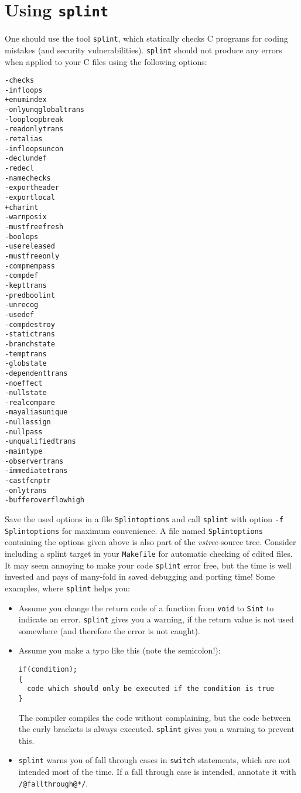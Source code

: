 \documentclass[12pt]{article}
\begin{document}
\section{Using \texttt{splint}}
One should use the tool \texttt{splint}, which  statically checks C programs 
for coding mistakes (and security vulnerabilities).
\texttt{splint} should not produce any errors when applied to your C files using the following options:
\begin{footnotesize}
\begin{verbatim}
-checks
-infloops
+enumindex
-onlyunqglobaltrans
-looploopbreak
-readonlytrans
-retalias
-infloopsuncon
-declundef
-redecl
-namechecks
-exportheader
-exportlocal
+charint
-warnposix
-mustfreefresh
-boolops
-usereleased
-mustfreeonly
-compmempass
-compdef
-kepttrans
-predboolint
-unrecog
-usedef
-compdestroy
-statictrans
-branchstate
-temptrans
-globstate
-dependenttrans
-noeffect
-nullstate
-realcompare
-mayaliasunique
-nullassign
-nullpass
-unqualifiedtrans
-maintype
-observertrans
-immediatetrans
-castfcnptr
-onlytrans
-bufferoverflowhigh
\end{verbatim}
\end{footnotesize}
Save the used options in a file \texttt{Splintoptions} and call \texttt{splint} with option \texttt{-f Splintoptions} for maximum convenience. 
A file named \texttt{Splintoptions} containing the options given above is also
part of the \emph{vstree}-source tree.
Consider including a splint target in your \texttt{Makefile} for automatic checking of edited files.
It may seem annoying to make your code \texttt{splint} error free, but the time
is well invested and pays of many-fold in saved debugging and porting time!
Some examples, where \texttt{splint} helps you:
\begin{itemize}
\item Assume you change the return code of a function from \texttt{void} to \texttt{Sint} to indicate an error. \texttt{splint} gives you a warning, if the return value is not used somewhere (and therefore the error is not caught). 
\item Assume you make a typo like this (note the semicolon!):
\begin{verbatim}
if(condition);
{
  code which should only be executed if the condition is true
}
\end{verbatim}
The compiler compiles the code without complaining, but the code between
the curly brackets is always executed. \texttt{splint} gives you a warning to prevent this. 
\item \texttt{splint} warns you of fall through cases in \texttt{switch} statements, which are not intended most of the time. If a fall through case is intended, annotate it with \texttt{/@fallthrough@*/}.
\end{itemize}
\end{document}
